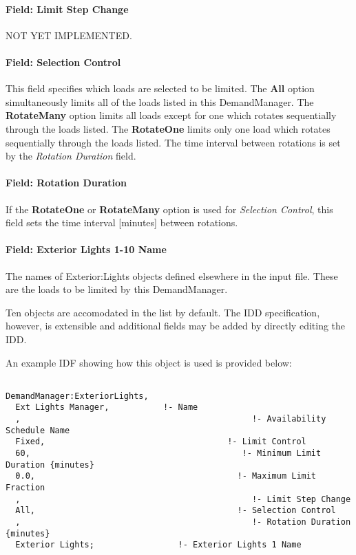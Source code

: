 \paragraph{Field: Limit Step Change}\label{field-limit-step-change}

NOT YET IMPLEMENTED.

\paragraph{Field: Selection Control}\label{field-selection-control}

This field specifies which loads are selected to be limited. The \textbf{All} option simultaneously limits all of the loads listed in this DemandManager. The \textbf{RotateMany} option limits all loads except for one which rotates sequentially through the loads listed. The \textbf{RotateOne} limits only one load which rotates sequentially through the loads listed. The time interval between rotations is set by the \emph{Rotation Duration} field.

\paragraph{Field: Rotation Duration}\label{field-rotation-duration}

If the \textbf{RotateOne} or \textbf{RotateMany} option is used for \emph{Selection Control}, this field sets the time interval {[}minutes{]} between rotations.

\paragraph{Field: Exterior Lights 1-10 Name}\label{field-exterior-lights-1-10-name}

The names of Exterior:Lights objects defined elsewhere in the input file. These are the loads to be limited by this DemandManager.

Ten objects are accomodated in the list by default. The IDD specification, however, is extensible and additional fields may be added by directly editing the IDD.

An example IDF showing how this object is used is provided below:

\begin{lstlisting}

DemandManager:ExteriorLights,
  Ext Lights Manager,           !- Name
  ,                                               !- Availability Schedule Name
  Fixed,                                     !- Limit Control
  60,                                           !- Minimum Limit Duration {minutes}
  0.0,                                         !- Maximum Limit Fraction
  ,                                               !- Limit Step Change
  All,                                         !- Selection Control
  ,                                               !- Rotation Duration {minutes}
  Exterior Lights;                 !- Exterior Lights 1 Name
\end{lstlisting}

